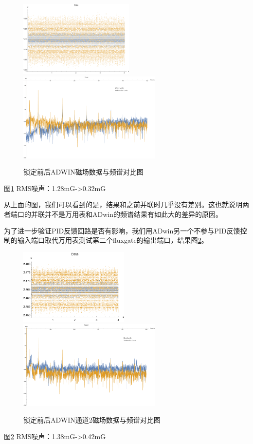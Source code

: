 \documentclass[onecolumn,a4paper,10pt]{article}
\begin{document}
\begin{figure}[htbp]
\centering
\includegraphics[height=1.5in]{Data-Sep-Adwin}%
\hspace{0.4in}%
\includegraphics[height=1.75in]{Fourier-Sep-Adwin}
\caption{锁定前后ADWIN磁场数据与频谱对比图}
\label{fig:1104}
\end{figure}

图\ref{fig:1104} RMS噪声：1.28mG->0.32mG

从上面的图，我们可以看到的是，结果和之前并联时几乎没有差别。这也就说明两者端口的并联并不是万用表和ADwin的频谱结果有如此大的差异的原因。

为了进一步验证PID反馈回路是否有影响，我们用ADwin另一个不参与PID反馈控制的输入端口取代万用表测试第二个fluxgate的输出端口，结果图\ref{fig:1203}。
\newpage
\begin{figure}[htbp]
\centering
\includegraphics[height=1.5in]{Data-Sensor2-Adwin}%
\hspace{0.4in}%
\includegraphics[height=1.75in]{Fourier-Sensor2-Adwin}
\caption{锁定前后ADWIN通道2磁场数据与频谱对比图}
\label{fig:1203}
\end{figure}
图\ref{fig:1203} RMS噪声：1.38mG->0.42mG
\end{document}
